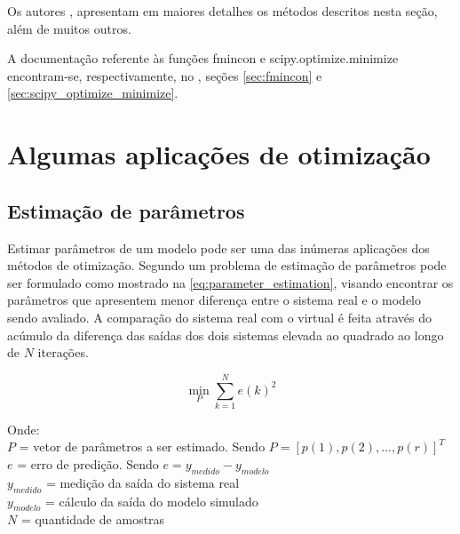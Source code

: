 Os autores ,  apresentam em maiores detalhes
os métodos descritos nesta seção, além de muitos outros.

A documentação referente às funções fmincon e scipy.optimize.minimize encontram-se, respectivamente,
no , seções \ref{sec:fmincon} e \ref{sec:scipy_optimize_minimize}.

\section{Algumas aplicações de otimização}
\label{sec:aplicacoes_de_otimizacao}

\subsection{Estimação de parâmetros}
\label{subsec:estimacao_de_parametros}

Estimar parâmetros de um modelo pode ser uma das inúmeras aplicações dos métodos de otimização.
Segundo  um problema de estimação de parâmetros pode ser formulado
como mostrado na \cref{eq:parameter_estimation}, visando encontrar os parâmetros que
apresentem menor diferença entre o sistema real e o modelo sendo avaliado.
A comparação do sistema real com o virtual é feita através do acúmulo da diferença das saídas dos
dois sistemas elevada ao quadrado ao longo de $N$ iterações.

\begin{equation}
	\label{eq:parameter_estimation}
	\min_{P} \sum_{k=1}^{N} e(k)^2
\end{equation}

\noindent
Onde: \\
$P$ = vetor de parâmetros a ser estimado. Sendo $ P = [p(1), p(2), ..., p(r)]^T $ \\
$e$ = erro de predição. Sendo $ e = y_{medido} - y_{modelo} $ \\
$ y_{medido} $ = medição da saída do sistema real \\
$ y_{modelo} $ = cálculo da saída do modelo simulado \\
$ N $ = quantidade de amostras
\newline

